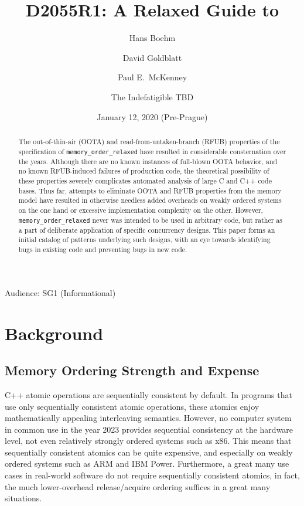 \documentclass[10]{article}
\begin{document}
\title{D2055R1: A Relaxed Guide to }

\newcommand{\co}[1]{\lstinline[breaklines=yes,breakatwhitespace=yes]{#1}}

\author{
Hans Boehm\\ \and
David Goldblatt\\ \and
Paul E.~McKenney\\ \and
The Indefatigible TBD
}
\date{January 12, 2020 (Pre-Prague)}
\maketitle{}

Audience: SG1 (Informational)

\begin{abstract}
	The out-of-thin-air (OOTA) and read-from-untaken-branch (RFUB)
	properties of the specification of \co{memory_order_relaxed}
	have resulted in considerable consternation over the years.
	Although there are no known instances of full-blown OOTA
	behavior, and no known RFUB-induced failures of production code,
	the theoretical possibility of these properties severely
	complicates automated analysis of large C and C++ code bases.
	Thus far, attempts to eliminate OOTA and RFUB properties from
	the memory model have resulted in otherwise needless added
	overheads on weakly ordered systems on the one hand or
	excessive implementation complexity on the other.
	However, \co{memory_order_relaxed} never was intended to be used
	in arbitrary code, but rather as a part of deliberate application
	of specific concurrency designs.
	This paper forms an initial catalog of patterns underlying such
	designs, with an eye towards identifying bugs in existing code
	and preventing bugs in new code.
\end{abstract}

\section{Background}
\label{sec:Background}

\subsection{Memory Ordering Strength and Expense}
\label{sec:Memory Ordering Strength and Expense}

C++ atomic operations are sequentially consistent by default.
In programs that use only sequentially consistent atomic operations,
these atomics enjoy mathematically appealing interleaving semantics.
However, no computer system in common use in the year 2023 provides
sequential consistency at the hardware level, not even relatively
strongly ordered systems such as x86.
This means that sequentially consistent atomics can be quite expensive,
and especially on weakly ordered systems such as ARM and IBM Power.
Furthermore, a great many use cases in real-world software do not
require sequentially consistent atomics, in fact, the much lower-overhead
release/acquire ordering suffices in a great many situations.
\end{document}
